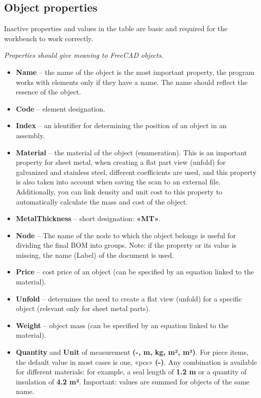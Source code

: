 \documentclass[a4paper,12pt]{article}
\begin{document}
\subsection{Object properties}

Inactive properties and values ​​in the table are basic and required for the workbench to work correctly.

\begin{center}\emph{Properties should give meaning to FreeCAD objects.}\end{center}

\begin{itemize}
	\item \textbf{Name} -- the name of the object is the most important property, the program works with elements only if they have a name. The name should reflect the essence of the object.
	\item \textbf{Code} -- element designation.
	\item \textbf{Index} -- an identifier for determining the position of an object in an assembly.
	\item \textbf{Material} -- the material of the object (enumeration). This is an important property for sheet metal, when creating a flat part view (unfold) for galvanized and stainless steel, different coefficients are used, and this property is also taken into account when saving the scan to an external file. Additionally, you can link density and unit cost to this property to automatically calculate the mass and cost of the object.
	\item \textbf{MetalThickness} -- short designation: \textbf{«MT»}.
	\item \textbf{Node} -- The name of the node to which the object belongs is useful for dividing the final BOM into groups. Note: if the property or its value is missing, the name (Label) of the document is used.
	\item \textbf{Price} -- cost price of an object (can be specified by an equation linked to the material).
	\item \textbf{Unfold} -- determines the need to create a flat view (unfold) for a specific object (relevant only for sheet metal parts).
	\item \textbf{Weight} -- object mass (can be specified by an equation linked to the material).
	\item \textbf{Quantity} and \textbf{Unit} of measurement \textbf{(-, m, kg, m², m³)}. For piece items, the default value in most cases is one, «pcs» \textbf{(-)}. Any combination is available for different materials: for example, a seal length of \textbf{1.2 m} or a quantity of insulation of \textbf{4.2 m²}. Important: values ​​are summed for objects of the same name.
\end{itemize}
\end{document}
